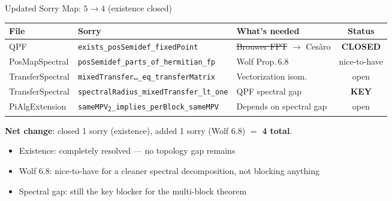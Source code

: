 \documentclass[aspectratio=169,10pt]{beamer}
\begin{document}
\begin{frame}{Updated Sorry Map: $5 \to 4$ (existence \textcolor{leangreen}{closed})}
    \vspace{-0.5em}
    \begin{center}
        {\scriptsize
            \begin{tabular}{@{}lp{5.8cm}p{3.0cm}c@{}}
                \toprule
                \textbf{File} & \textbf{Sorry} & \textbf{What's needed} & \textbf{Status} \\
                \midrule
                \rowcolor{leangreen!15!black}
                QPF & \texttt{exists\_posSemidef\_fixedPoint} &
                    \sout{Brouwer FPT} $\to$ Ces\`aro & \textcolor{leangreen}{\textbf{CLOSED}} \\[2pt]
                PosMapSpectral & \texttt{posSemidef\_parts\_of\_hermitian\_fp} &
                    Wolf Prop.\,6.8 & \textcolor{dimwhite}{nice-to-have} \\[2pt]
                TransferSpectral & \texttt{mixedTransfer\ldots\_eq\_transferMatrix} &
                    Vectorization isom.\ & \textcolor{softred}{open} \\[2pt]
                TransferSpectral & \texttt{spectralRadius\_mixedTransfer\_lt\_one} &
                    QPF spectral gap & \textcolor{softred}{\textbf{KEY}} \\[2pt]
                PiAlgExtension & \texttt{sameMPV\textsubscript{2}\_implies\_perBlock\_sameMPV} &
                    Depends on spectral gap & \textcolor{softred}{open} \\
                \bottomrule
            \end{tabular}
        }
    \end{center}

    \vspace{0.3em}
    \textbf{Net change}: closed 1 sorry (existence), added 1 sorry (Wolf 6.8) $=$ \textbf{4 total}.
    \begin{itemize}\itemsep0.1em\small
        \item \textcolor{leangreen}{Existence}: completely resolved --- no topology gap remains
        \item \textcolor{dimwhite}{Wolf 6.8}: nice-to-have for a cleaner spectral decomposition, not blocking anything
        \item \textcolor{softred}{Spectral gap}: still the key blocker for the multi-block theorem
    \end{itemize}
\end{frame}
\end{document}
